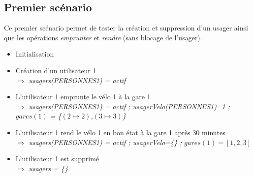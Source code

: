 \documentclass[12pt]{article}
\begin{document}
\subsection{Premier scénario}
Ce premier scénario permet de tester la création et suppression d'un usager ainsi que les opérations \textit{emprunter} et \textit{rendre} (sans blocage de l'usager).
\begin{itemize}
  \item Initialisation
  \item Création d'un utilisateur 1 \\
  $\Rightarrow$ \textit{usagers(PERSONNES1) = actif}
  \item L'utilisateur 1 emprunte le vélo 1 à la gare 1 \\
  $\Rightarrow$ \textit{usagers(PERSONNES1) = actif ; usagerVelo(PERSONNES1)=1 ; $gares(1)$ = \{$(2\mapsto2)$,$(3\mapsto3)$\}}
  \item L'utilisateur 1 rend le vélo 1 en bon état à la gare 1 après 30 minutes \\
  $\Rightarrow$ \textit{usagers(PERSONNES1) = actif ; usagerVelo=\{\} ; $gares(1) = [1,2,3]$}
  \item L'utilisateur 1 est supprimé \\
  $\Rightarrow$ \textit{usagers = \{\}}
\end{itemize}
\end{document}
